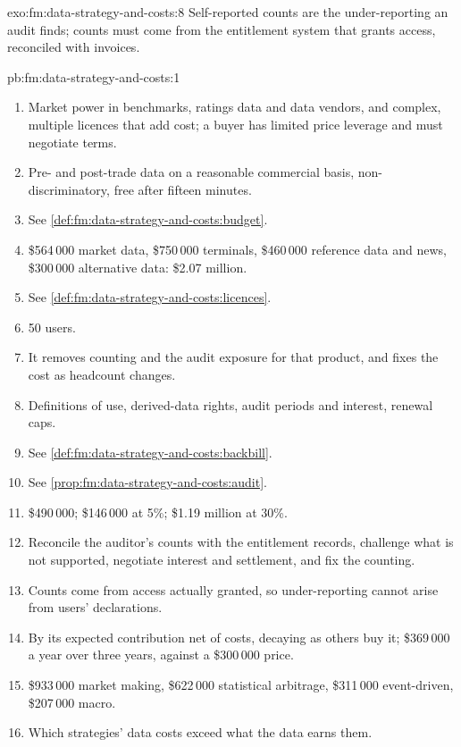 \begin{solution}{exo:fm:data-strategy-and-costs:8}
Self-reported counts are the under-reporting an audit finds; counts must come from the entitlement system that grants access, reconciled with
invoices.
\end{solution}

\begin{solution}{pb:fm:data-strategy-and-costs:1}
\begin{enumerate}
\item Market power in benchmarks, ratings data and data vendors, and complex, multiple licences that add cost; a buyer has limited price leverage
and must negotiate terms.
\item Pre- and post-trade data on a reasonable commercial basis, non-discriminatory, free after fifteen minutes.
\item See \cref{def:fm:data-strategy-and-costs:budget}.
\item \$564\,000 market data, \$750\,000 terminals, \$460\,000 reference data and news, \$300\,000 alternative data: \$2.07 million.
\item See \cref{def:fm:data-strategy-and-costs:licences}.
\item 50 users.
\item It removes counting and the audit exposure for that product, and fixes the cost as headcount changes.
\item Definitions of use, derived-data rights, audit periods and interest, renewal caps.
\item See \cref{def:fm:data-strategy-and-costs:backbill}.
\item See \cref{prop:fm:data-strategy-and-costs:audit}.
\item \$490\,000; \$146\,000 at 5\%; \$1.19 million at 30\%.
\item Reconcile the auditor's counts with the entitlement records, challenge what is not supported, negotiate interest and settlement, and fix the
counting.
\item Counts come from access actually granted, so under-reporting cannot arise from users' declarations.
\item By its expected contribution net of costs, decaying as others buy it; \$369\,000 a year over three years, against a \$300\,000 price.
\item \$933\,000 market making, \$622\,000 statistical arbitrage, \$311\,000 event-driven, \$207\,000 macro.
\item Which strategies' data costs exceed what the data earns them.

\end{enumerate}
\end{solution}
